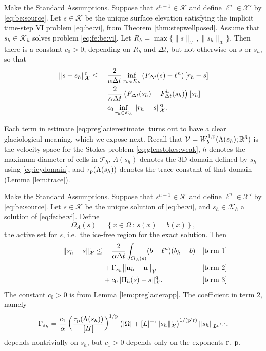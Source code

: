 \documentclass[hidelinks,onefignum,onetabnum,final]{siamart220329}  %
\newcommand{\RR}{\mathbb{R}}
\newcommand{\bu}{\mathbf{u}}
\newcommand{\cK}{\mathcal{K}}
\newcommand{\cT}{\mathcal{T}}
\newcommand{\cV}{\mathcal{V}}
\newcommand{\cX}{\mathcal{X}}
\newcommand{\pp}{{\text{\textnormal{p}}}}
\newcommand{\qq}{{\text{\textnormal{q}}}}
\newcommand{\rr}{{\text{\textnormal{r}}}}
\begin{document}
\begin{lemma} \label{lem:preglacierapp}  Make the Standard Assumptions.  Suppose that $s^{n-1}\in\cK$ and define $\ell^n \in \cX'$ by \eqref{eq:be:source}.  Let $s\in\cK$ be the unique surface elevation satisfying the implicit time-step VI problem \eqref{eq:be:vi}, from Theorem \ref{thm:stepwellposed}.  Assume that $s_h\in\cK_h$ solves problem \eqref{eq:fe:be:vi}.  Let $R_h=\max\{\|s\|_\cX,\|s_h\|_\cX\}$.  Then there is a constant $c_0>0$, depending on $R_h$ and $\Delta t$, but not otherwise on $s$ or $s_h$, so that
\begin{align}
\|s-s_h\|_\cX^\rr &\le \quad \frac{2}{\alpha \Delta t} \inf_{r_h\in\cK_h} \left(F_{\Delta t}(s)-\ell^n\right)[r_h-s] \label{eq:preglacierestimate} \\
   &\quad\, + \frac{2}{\alpha \Delta t} \left(F_{\Delta t}(s_h)-F^h_{\Delta t}(s_h)\right)[s_h] \notag \\
   &\quad\, + c_0 \inf_{r_h\in\cK_h} \|r_h - s\|_{\cX}^\qq. \notag
\end{align}
\end{lemma}

Each term in estimate \eqref{eq:preglacierestimate} turns out to have a clear glaciological meaning, which we expose next.  Recall that $\cV=W_b^{1,\pp}(\Lambda(s_h); \RR^3)$ is the velocity space for the Stokes problem \eqref{eq:glenstokes:weak}, $h$ denotes the maximum diameter of cells in $\cT_h$, $\Lambda(s_h)$ denotes the 3D domain defined by $s_h$ using \eqref{eq:icydomain}, and $\tau_\pp(\Lambda(s_h))$ denotes the trace constant of that domain (Lemma \ref{lem:trace}).

\begin{theorem} \label{thm:glacierapp}  Make the Standard Assumptions.  Suppose that $s^{n-1}\in\cK$ and define $\ell^n \in \cX'$ by \eqref{eq:be:source}.  Let $s\in\cK$ be the unique solution of \eqref{eq:be:vi}, and $s_h\in\cK_h$ a solution of \eqref{eq:fe:be:vi}.  Define
\begin{equation}
\Omega_A(s) = \left\{x\in\Omega\,:\,s(x)=b(x)\right\},
\end{equation}
the active set for $s$, i.e.~the ice-free region for the exact solution.  Then
\begin{align}
\phantom{dfkljsd} \|s_h-s\|_\cX^\rr &\le \quad \frac{2}{\alpha \Delta t} \int_{\Omega_A(s)} (b - \ell^n) (b_h - b) &&\text{\textnormal{[term 1]}} \label{eq:glacierestimate} \\
   &\quad\, + \Gamma_{s_h} \big\|\bu_h - \bu\big\|_{\cV} &&\text{\textnormal{[term 2]}} \notag \\
   &\quad\, + c_0 \|\Pi_h(s) - s\|_\cX^\qq. &&\text{\textnormal{[term 3]}} \notag
\end{align}
The constant $c_0>0$ is from Lemma \ref{lem:preglacierapp}.  The coefficient in term 2, namely
\begin{equation}
\Gamma_{s_h} = \frac{c_1}{\alpha} \left(\frac{\tau_\pp(\Lambda(s_h))}{[H]}\right)^{1/\pp} \left(|\Omega| + [L]^{-\rr}\|s_h\|_{\cX}^\rr\right)^{1/(\pp'\rr)} \|s_h\|_{L^{\pp'\rr'}},
\end{equation}
depends nontrivially on $s_h$, but $c_1>0$ depends only on the exponents $\rr$, $\pp$.
\end{theorem}
\end{document}
